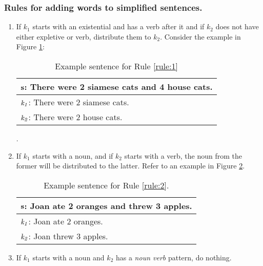 \documentclass[11pt]{article}
\begin{document}
\subsubsection{Rules for adding words to simplified sentences.}\label{sec:secondsentencesimplification}
\begin{enumerate}[topsep=0pt,itemsep=-1ex,partopsep=1ex,parsep=1ex]
\item \label{rule:1}
If $\mathit{k_{1}}$ starts with an existential and has a verb after it and if $\mathit{k_{2}}$ does not have either expletive or verb, distribute them to $\mathit{k_{2}}$. Consider the example in Figure \ref{figure:3}:
\vspace{0cm}
\begin{table}[h!]
\centering
\begin{tabular}{ | m{7cm} | }
\hline
 $\mathbf{\small s}$\textbf{\small : There were 2 siamese cats and 4 house cats.}\\
\hline
$\mathit{\small k_{1}}$\small : There were 2 siamese cats.\\
\hline
$\mathit{\small k_{2}}$\small : There were 2 house cats.\\
\hline
\end{tabular}
\caption{Example sentence for Rule \ref{rule:1}}.
\label{figure:3}
\end{table}
\vspace{-1.20cm}
\item \label{rule:2}
\vspace{1.1cm}
If $\mathit{k_{1}}$ starts with a noun, and if $\mathit{k_{2}}$ starts with a verb, the noun from the former will be distributed to the latter. Refer to an example in Figure \ref{figure:4}.
\vspace{-0.2cm}
\begin{table}[h!]
\centering
\begin{tabular}{ | m{7cm} | }
\hline
 $\mathbf{\small s}$\textbf{\small : Joan ate 2 oranges and threw 3 apples.}\\
\hline
$\mathit{\small k_{1}}$\small : Joan ate 2 oranges.\\
\hline
$\mathit{\small k_{2}}$\small : Joan threw 3 apples.\\
\hline
\end{tabular}
\caption{Example sentence for Rule \ref{rule:2}.}
\label{figure:4}
\end{table}
\vspace{0.5cm}
\item  \label{rule:3}
If $\mathit{k_{1}}$ starts with a noun and $\mathit{k_{2}}$ has a \textit{noun verb} pattern, do nothing.

\end{enumerate}
\end{document}
